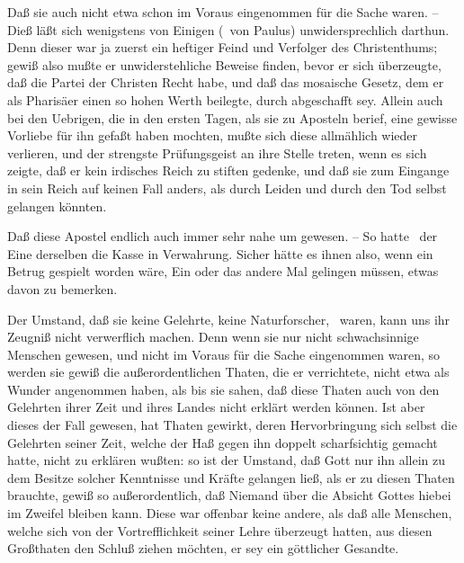\begin{aufza}
\begin{aufzb}
\begin{aufzc}
\item Daß sie auch nicht etwa schon im Voraus eingenommen für die Sache  waren. -- Dieß läßt sich wenigstens von Einigen (\zB\ von Paulus) unwidersprechlich darthun. Denn dieser war ja zuerst ein heftiger Feind und Verfolger des Christenthums; gewiß also mußte er unwiderstehliche Beweise finden, bevor er sich überzeugte, daß die Partei der Christen Recht habe, und daß das mosaische Gesetz, dem er als Pharisäer einen so hohen Werth beilegte, durch  abgeschafft sey. Allein auch bei den Uebrigen, die in den ersten Tagen, als  sie zu Aposteln berief, eine gewisse Vorliebe für ihn gefaßt haben mochten, mußte sich diese allmählich wieder verlieren, und der strengste Prüfungsgeist an ihre Stelle treten, wenn es sich zeigte, daß er kein irdisches Reich zu stiften gedenke, und daß sie zum Eingange in sein Reich auf keinen Fall anders, als durch Leiden und durch den Tod selbst gelangen könnten.
\item Daß diese Apostel endlich auch immer sehr nahe um  gewesen. -- So hatte \zB\ der Eine derselben die Kasse in Verwahrung. Sicher hätte es ihnen also, wenn ein Betrug gespielt worden wäre, Ein oder das andere Mal gelingen müssen, etwas davon zu bemerken.
\item Der Umstand, daß sie keine Gelehrte, keine Naturforscher, \udgl\ waren, kann uns ihr Zeugniß nicht verwerflich machen. Denn wenn sie nur nicht schwachsinnige Menschen gewesen, und nicht im Voraus für die Sache  eingenommen waren, so werden sie gewiß die außerordentlichen Thaten, die er verrichtete, nicht etwa als Wunder angenommen haben, als bis sie sahen, daß diese Thaten auch von den Gelehrten ihrer Zeit und ihres Landes nicht erklärt werden können. Ist aber dieses der Fall gewesen, hat  Thaten gewirkt, deren Hervorbringung sich selbst die Gelehrten seiner Zeit, welche der Haß gegen ihn doppelt scharfsichtig gemacht hatte, nicht zu erklären wußten: so ist der Umstand, daß Gott nur ihn allein zu dem Besitze solcher Kenntnisse und Kräfte gelangen ließ, als er zu diesen Thaten brauchte, gewiß so außerordentlich, daß Niemand über die Absicht Gottes hiebei im Zweifel bleiben kann. Diese war offenbar keine andere, als daß alle Menschen, welche sich von der Vortrefflichkeit seiner Lehre überzeugt hatten, aus diesen Großthaten den Schluß ziehen möchten, er sey ein göttlicher Gesandte.~
\end{aufzc}
\end{aufzb}
\end{aufza}

